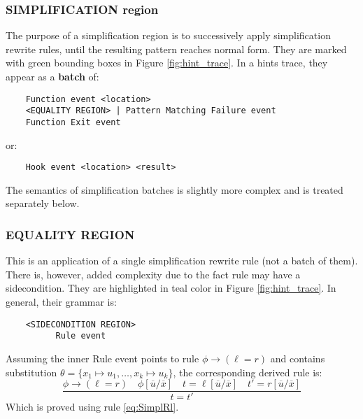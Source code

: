 \documentclass{article}
\theoremstyle{plain}
\theoremstyle{definition}
\begin{document}
\subsubsection*{SIMPLIFICATION region}

The purpose of a simplification region is to successively apply simplification rewrite rules, until the resulting pattern reaches normal form. They are marked with green bounding boxes in Figure \ref{fig:hint_trace}. In a hints trace, they appear as a \textbf{batch} of:

\begin{verbatim}
    Function event <location>
    <EQUALITY REGION> | Pattern Matching Failure event
    Function Exit event
\end{verbatim}

or:
\begin{verbatim}
    Hook event <location> <result>
\end{verbatim}

The semantics of simplification batches is slightly more complex and is treated separately below.

\subsubsection*{EQUALITY REGION}
This is an application of a single simplification rewrite rule (not a batch of them). There is, however, added complexity due to the fact rule may have a sidecondition. They are highlighted in teal color in Figure \ref{fig:hint_trace}. In general, their grammar is:

\begin{verbatim}
    <SIDECONDITION REGION>
          Rule event
\end{verbatim}

Assuming the inner Rule event points to rule $\phi \rightarrow (\ell = r)$ and contains substitution $\theta = \{x_1\mapsto u_1,\ldots,x_k\mapsto u_k\}$, the corresponding derived rule is:
\[
\dfrac
{
\phi \rightarrow (\ell = r) \quad  \phi[\overline{u}/\overline{x}] \quad t = \ell[\overline{u}/\overline{x}] \quad t' = r[\overline{u}/\overline{x}]
}
{t = t'}
\tag{EQUALITY}\label{rule:equality}
\]
Which is proved using rule \eqref{eq:SimplRl}.
\end{document}
